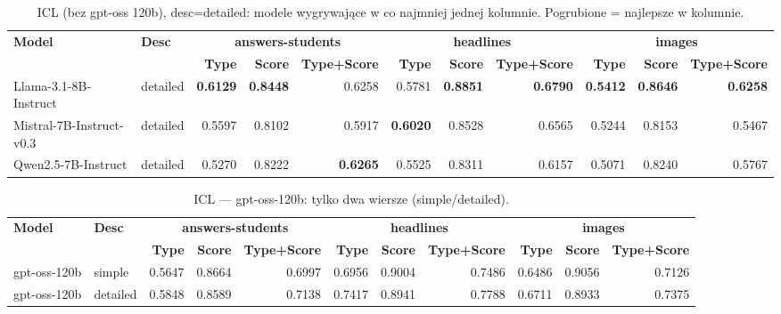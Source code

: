 \begin{table}[t]
\centering
\scriptsize
\setlength{\tabcolsep}{3.5pt}
\begin{adjustbox}{width=\textwidth}
\begin{tabular}{l l r r r r r r r r r}
\hline
\textbf{Model} & \textbf{Desc} & \multicolumn{3}{c}{\textbf{answers-students}} & \multicolumn{3}{c}{\textbf{headlines}} & \multicolumn{3}{c}{\textbf{images}} \\
 &  & \textbf{Type} & \textbf{Score} & \textbf{Type+Score} & \textbf{Type} & \textbf{Score} & \textbf{Type+Score} & \textbf{Type} & \textbf{Score} & \textbf{Type+Score} \\
\hline
Llama-3.1-8B-Instruct & detailed & \textbf{0.6129} & \textbf{0.8448} & 0.6258 & 0.5781 & \textbf{0.8851} & \textbf{0.6790} & \textbf{0.5412} & \textbf{0.8646} & \textbf{0.6258} \\
Mistral-7B-Instruct-v0.3 & detailed & 0.5597 & 0.8102 & 0.5917 & \textbf{0.6020} & 0.8528 & 0.6565 & 0.5244 & 0.8153 & 0.5467 \\
Qwen2.5-7B-Instruct & detailed & 0.5270 & 0.8222 & \textbf{0.6265} & 0.5525 & 0.8311 & 0.6157 & 0.5071 & 0.8240 & 0.5767 \\
\hline
\end{tabular}
\end{adjustbox}
\caption{ICL (bez gpt-oss 120b), desc=detailed: modele wygrywające w co najmniej jednej kolumnie. Pogrubione = najlepsze w kolumnie.}
\end{table}

\begin{table}[t]
\centering
\scriptsize
\setlength{\tabcolsep}{3.5pt}
\begin{adjustbox}{width=\textwidth}
\begin{tabular}{l l r r r r r r r r r}
\hline
\textbf{Model} & \textbf{Desc} & \multicolumn{3}{c}{\textbf{answers-students}} & \multicolumn{3}{c}{\textbf{headlines}} & \multicolumn{3}{c}{\textbf{images}} \\
 &  & \textbf{Type} & \textbf{Score} & \textbf{Type+Score} & \textbf{Type} & \textbf{Score} & \textbf{Type+Score} & \textbf{Type} & \textbf{Score} & \textbf{Type+Score} \\
\hline
gpt-oss-120b & simple & 0.5647 & 0.8664 & 0.6997 & 0.6956 & 0.9004 & 0.7486 & 0.6486 & 0.9056 & 0.7126 \\
gpt-oss-120b & detailed & 0.5848 & 0.8589 & 0.7138 & 0.7417 & 0.8941 & 0.7788 & 0.6711 & 0.8933 & 0.7375 \\
\hline
\end{tabular}
\end{adjustbox}
\caption{ICL — gpt-oss-120b: tylko dwa wiersze (simple/detailed).}
\end{table}
